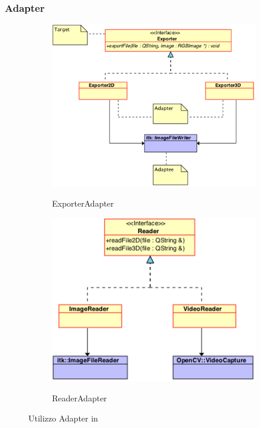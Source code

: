 \subsubsection{Adapter}
\label{strutt_ada}
\begin{figure}[!h]
		\centering
		\begin{subfigure}[b]{0.5\textwidth}
				\includegraphics[width=1.2\textwidth]{./Content/Immagini/ExporterAdapter.png}
				\label{adapter}
				\caption{ExporterAdapter}
		\end{subfigure}
		\begin{subfigure}[b]{0.5\textwidth}
				\includegraphics[width=1.2\textwidth]{./Content/Immagini/ReaderAdapter.png}
				\label{adapter}
				\caption{ReaderAdapter}
		\end{subfigure}
		\caption{Utilizzo Adapter in \project}
\end{figure}
